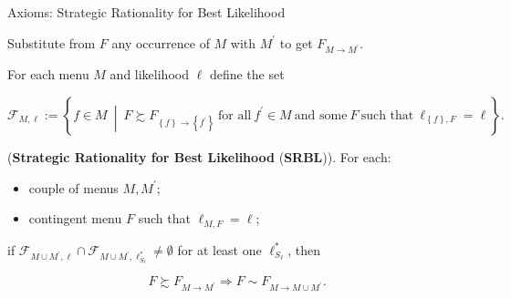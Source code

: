 \documentclass[usenames,dvipsnames,aspectratio=169,11pt]{beamer}
\begin{document}
\begin{frame}{Axioms: Strategic Rationality for Best Likelihood}\label{srblapp}

	Substitute from \( F \) any occurrence of \( M \) with \( M^{\prime} \) to get \( F_{M \rightarrow M^{\prime}} \).

	\vfill

	For each menu \( M \) and likelihood \( \ell \) define the set

	\[
		\mathcal{F}_{M, \ell} := \left\{ f \in M \: \middle\vert \: F \succsim F_{\left\{ f \right\} \rightarrow \left\{ f^{\prime} \right\}} \: \text{for all} \: f^{\prime} \in M \: \text{and some} \: F \: \text{such that} \: \ell_{\left\{ f \right\}, F} = \ell \right\} .
	\]

	\begin{axiom}\label{ax:appsrbl}

		(\textbf{Strategic Rationality for Best Likelihood} (\textbf{SRBL})). For each:
		\begin{itemize}
			\item couple of menus \( M, M^{\prime} \);
			\item contingent menu \( F \) such that \( \ell_{M,F} = \ell \);
		\end{itemize}
		if \( \mathcal{F}_{M \cup M^{\prime}, \ell} \cap \mathcal{F}_{M \cup M^{\prime}, \ell^{*}_{S_{\ell}}} \neq \emptyset \) for at least one \( \ell_{S_{\ell}}^{*} \), then

		\[
			F \succsim F_{M \rightarrow M^{\prime}} \Rightarrow F \sim F_{M \rightarrow M \cup M^{\prime}} .
		\]

	\end{axiom}

	\begin{flushright}
		\hyperlink{srbl}{}
	\end{flushright}


\end{frame}
\end{document}

